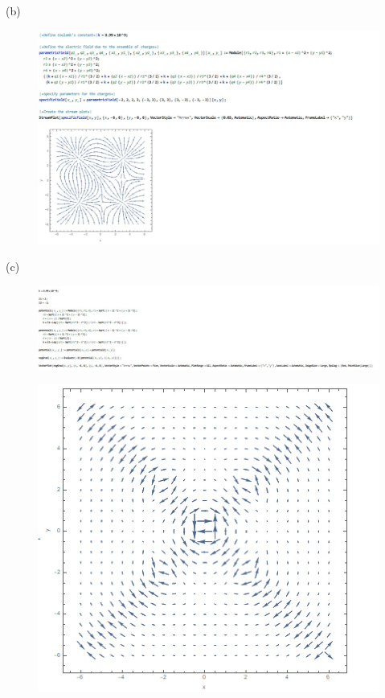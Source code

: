 \documentclass[journal,12pt,onecolumn]{IEEEtran}
\theoremstyle{remark}
\begin{document}
(b)\begin{figure}[H]
    \centering
     \includegraphics[scale=0.4]{figs/e2.jpeg}
    \caption{}    
    \label{fig:ishitha.em.fig1}
\end{figure}
\newpage
(c)\\
\begin{figure}[H]
    \centering
     \includegraphics[scale=0.55]{figs/e.1.1.jpeg}
    \caption{}    
    \label{fig:ishitha.em.fig1}
   \end{figure} \begin{figure}[H]
    \centering
     \includegraphics[scale=0.5]{figs/e.1.jpeg}
    \caption{}    
    \label{fig:ishitha.em.fig1}
   \end{figure}
\end{document}
